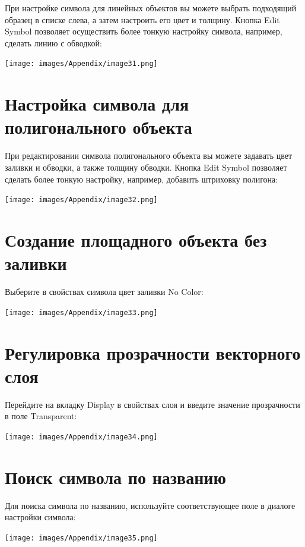 \documentclass[12pt,]{book}
\begin{document}
При настройке символа для линейных объектов вы можете выбрать подходящий образец в списке слева, а затем настроить его цвет и толщину. Кнопка Edit Symbol позволяет осуществить более тонкую настройку символа, например, сделать линию с обводкой:

\texttt{[image: images/Appendix/image31.png]}

\hypertarget{manual-vector-polygon}{%
\section{Настройка символа для полигонального объекта}\label{manual-vector-polygon}}

При редактировании символа полигонального объекта вы можете задавать цвет заливки и обводки, а также толщину обводки. Кнопка Edit Symbol позволяет сделать более тонкую настройку, например, добавить штриховку полигона:

\texttt{[image: images/Appendix/image32.png]}

\hypertarget{manual-vector-nullfill}{%
\section{Создание площадного объекта без заливки}\label{manual-vector-nullfill}}

Выберите в свойствах символа цвет заливки No Color:

\texttt{[image: images/Appendix/image33.png]}

\hypertarget{manual-vector-transparency}{%
\section{Регулировка прозрачности векторного слоя}\label{manual-vector-transparency}}

Перейдите на вкладку Display в свойствах слоя и введите значение прозрачности в поле Transparent:

\texttt{[image: images/Appendix/image34.png]}

\hypertarget{manual-vector-search}{%
\section{Поиск символа по названию}\label{manual-vector-search}}

Для поиска символа по названию, используйте соответствующее поле в диалоге настройки символа:

\texttt{[image: images/Appendix/image35.png]}
\end{document}
